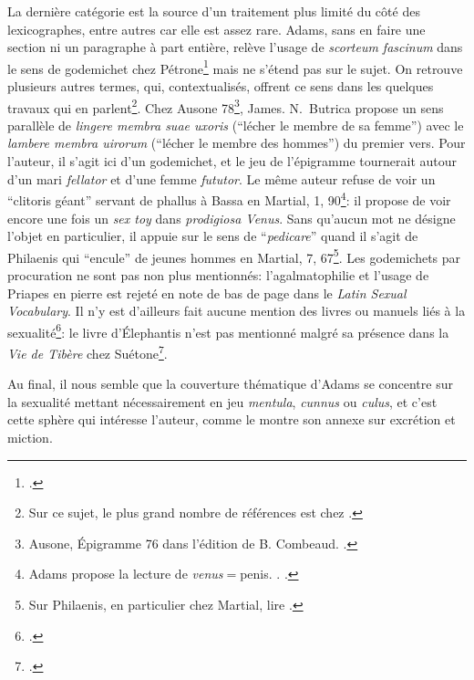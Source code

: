 La dernière catégorie est la source d'un traitement plus limité du côté des lexicographes, entre autres car elle est assez rare. Adams, sans en faire une section ni un paragraphe à part entière, relève l'usage de \textit{scorteum fascinum} dans le sens de godemichet chez Pétrone\footcite[p.~63]{adams} mais ne s'étend pas sur le sujet. On retrouve plusieurs autres termes, qui, contextualisés, offrent ce sens dans les quelques travaux qui en parlent\footnote{Sur ce sujet, le plus grand nombre de références est chez \textcite{parker1997teratogenic}.}. Chez Ausone 78\footnote{Ausone, Épigramme 76 dans l'édition de B. Combeaud. \textcite[pp.~223-223]{butrica_myths_2005}.}, James. N.~Butrica propose un sens parallèle de \textit{lingere membra suae uxoris} (\enquote{lécher le membre de sa femme}) avec le \textit{lambere membra uirorum} (\enquote{lécher le membre des hommes}) du premier vers. Pour l'auteur, il s'agit ici d'un godemichet, et le jeu de l'épigramme tournerait autour d'un mari \textit{fellator} et d'une femme \textit{fututor}. Le même auteur refuse de voir un \enquote{clitoris géant} servant de phallus à Bassa en Martial, 1, 90\footnote{Adams propose la lecture de \textit{venus}$=$penis. \textcite[p.~98]{adams}. \textcite[p.~255]{butrica_myths_2005}.}: il propose de voir encore une fois un \textit{sex toy} dans \textit{prodigiosa Venus}. Sans qu'aucun mot ne désigne l'objet en particulier, il appuie sur le sens de \enquote{\textit{pedicare}} quand il s'agit de Philaenis qui \enquote{encule} de jeunes hommes en Martial, 7, 67\footnote{Sur Philaenis, en particulier chez Martial, lire \textcite{boehringer_not_2018}.}. Les godemichets par procuration ne sont pas non plus mentionnés: l'agalmatophilie et l'usage de Priapes en pierre est rejeté en note de bas de page dans le \textit{Latin Sexual Vocabulary}. Il n'y est d'ailleurs fait aucune mention des livres ou manuels liés à la sexualité\footcite[p.185]{puccini_delbey_vie_2010}: le livre d'Élephantis n'est pas mentionné malgré sa présence dans la \textit{Vie de Tibère} chez Suétone\footcite[p.~190]{gladhill_tiberius_2018}.

Au final, il nous semble que la couverture thématique d'Adams se concentre sur la sexualité mettant nécessairement en jeu \textit{mentula}, \textit{cunnus} ou \textit{culus}, et c'est cette sphère qui intéresse l'auteur, comme le montre son annexe sur excrétion et miction.


